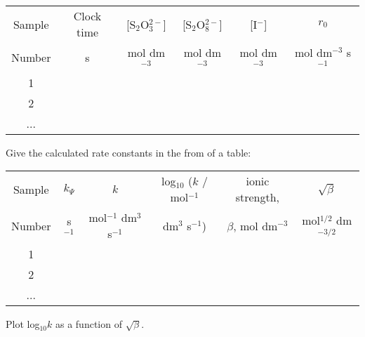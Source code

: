 \begin{table}[H]
\begin{tabular}{|c|c|c|c|c|c|}
\hline
Sample & Clock time & [S$_2$O$_3^{2-}$] & [S$_2$O$_8^{2-}$] & [I$^{-}$] & $r_0$ \\

Number   & s & mol dm$^{-3}$ & mol dm$^{-3}$ & mol dm$^{-3}$ & mol dm$^{-3}$ s$^{-1}$  \\

\hline
1 &   &   &   &   &    \\

\hline
2 &   &   &  &   &    \\

\hline
... &   &   &  &   &    \\

\hline
\end{tabular}
\end{table}


Give the calculated rate constants in the from of a table:

\begin{table}[H]
\begin{tabular}{|c|c|c|c|c|c|}
\hline
Sample & $k_{\Psi}$ & $k$ & log$_{10}$ ($k$ /  mol$^{-1}$ & ionic strength, & $\sqrt{\beta}$ \\

Number   & s$^{-1}$ & mol$^{-1}$ dm$^3$ s$^{-1}$ &  dm$^3$ s$^{-1}$)  &  $\beta$, mol dm$^{-3}$ & mol$^{1/2}$ dm$^{-3/2}$  \\

\hline
1 &   &   &   &   &    \\

\hline
2 &   &   &  &   &    \\

\hline
... &   &   &  &   &    \\

\hline
\end{tabular}
\end{table}

Plot log$_{10} k$ as a function of $\sqrt{\beta}$.
